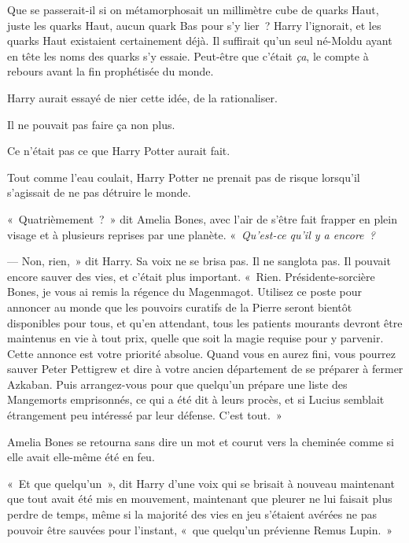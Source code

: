 Que se passerait-il si on métamorphosait un millimètre cube de quarks Haut, juste les quarks Haut, aucun quark Bas pour s'y lier~? Harry l'ignorait, et les quarks Haut existaient certainement déjà. Il suffirait qu'un seul né-Moldu ayant en tête les noms des quarks s'y essaie. Peut-être que c'était \emph{ça}, le compte à rebours avant la fin prophétisée du monde.

Harry aurait essayé de nier cette idée, de la rationaliser.

Il ne pouvait pas faire ça non plus.

Ce n'était pas ce que Harry Potter aurait fait.

Tout comme l'eau coulait, Harry Potter ne prenait pas de risque lorsqu'il s'agissait de ne pas détruire le monde.

«~Quatrièmement~?~» dit Amelia Bones, avec l'air de s'être fait frapper en plein visage et à plusieurs reprises par une planète. «~\emph{Qu'est-ce qu'il y a encore~?}

--- Non, rien,~» dit Harry. Sa voix ne se brisa pas. Il ne sanglota pas. Il pouvait encore sauver des vies, et c'était plus important. «~Rien. Présidente-sorcière Bones, je vous ai remis la régence du Magenmagot. Utilisez ce poste pour annoncer au monde que les pouvoirs curatifs de la Pierre seront bientôt disponibles pour tous, et qu'en attendant, tous les patients mourants devront être maintenus en vie à tout prix, quelle que soit la magie requise pour y parvenir. Cette annonce est votre priorité absolue. Quand vous en aurez fini, vous pourrez sauver Peter Pettigrew et dire à votre ancien département de se préparer à fermer Azkaban. Puis arrangez-vous pour que quelqu'un prépare une liste des Mangemorts emprisonnés, ce qui a été dit à leurs procès, et si Lucius semblait étrangement peu intéressé par leur défense. C'est tout.~»

Amelia Bones se retourna sans dire un mot et courut vers la cheminée comme si elle avait elle-même été en feu.

«~Et que quelqu'un~», dit Harry d'une voix qui se brisait à nouveau maintenant que tout avait été mis en mouvement, maintenant que pleurer ne lui faisait plus perdre de temps, même si la majorité des vies en jeu s'étaient avérées ne pas pouvoir être sauvées pour l'instant, «~que quelqu'un prévienne Remus Lupin.~»
